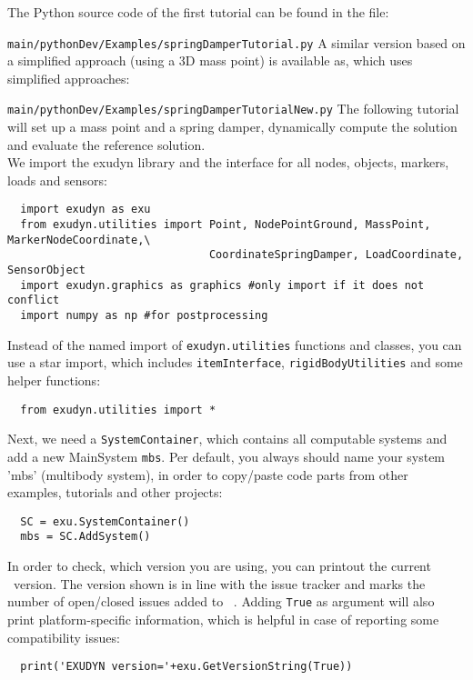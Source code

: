 The Python source code of the first tutorial can be found in the file:
\bi
  \item[] \texttt{main/pythonDev/Examples/springDamperTutorial.py}
\ei
A similar version based on a simplified approach (using a 3D mass point) is available as, which uses simplified approaches:
\bi
  \item[] \texttt{main/pythonDev/Examples/springDamperTutorialNew.py}
\ei
The following tutorial will set up a mass point and a spring damper, dynamically compute the solution and evaluate the reference solution.
\vspace{6pt}\\
We import the exudyn library and the interface for all nodes, objects, markers, loads and sensors:
\pythonstyle\begin{lstlisting}
  import exudyn as exu
  from exudyn.utilities import Point, NodePointGround, MassPoint, MarkerNodeCoordinate,\
                               CoordinateSpringDamper, LoadCoordinate, SensorObject
  import exudyn.graphics as graphics #only import if it does not conflict
  import numpy as np #for postprocessing
\end{lstlisting}
%
Instead of the named import of \texttt{exudyn.utilities} functions and classes, you can use a star import,
which includes \texttt{itemInterface}, \texttt{rigidBodyUtilities} and some helper functions:
\pythonstyle\begin{lstlisting}
  from exudyn.utilities import *
\end{lstlisting}
%
Next, we need a \texttt{SystemContainer}, which contains all computable systems and add a new MainSystem \texttt{mbs}.
Per default, you always should name your system 'mbs' (multibody system), in order to copy/paste code parts from other examples, tutorials and other projects:
\pythonstyle\begin{lstlisting}
  SC = exu.SystemContainer()
  mbs = SC.AddSystem()
\end{lstlisting}
%
In order to check, which version you are using, you can printout the current \codeName\ version. 
The version shown is in line with the issue tracker and marks the number of open/closed issues added to \codeName\ .
Adding \texttt{True} as argument will also print platform-specific information, which is helpful 
in case of reporting some compatibility issues:
\pythonstyle\begin{lstlisting}
  print('EXUDYN version='+exu.GetVersionString(True))
\end{lstlisting}
